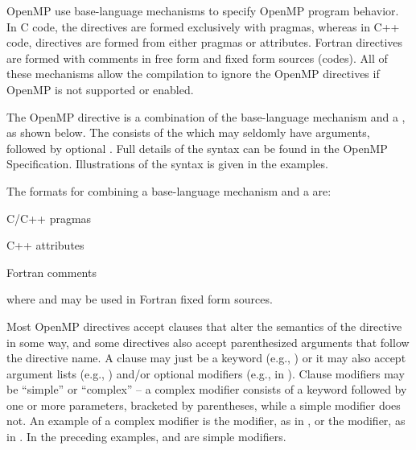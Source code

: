 \label{chap:directive_syntax}

OpenMP  use base-language mechanisms to specify OpenMP program behavior.
In C code, the directives are formed exclusively with pragmas, whereas in C++
code, directives are formed from either pragmas or attributes.
Fortran directives are formed with comments in free form and fixed form sources (codes).
All of these mechanisms allow the compilation to ignore the OpenMP directives if
OpenMP is not supported or enabled.


The OpenMP directive is a combination of the base-language mechanism and a ,
as shown below. The  consists
of the  which may seldomly have arguments, 
followed by optional . Full details of the syntax can be found in the OpenMP Specification.
Illustrations of the syntax is given in the examples.

The formats for combining a base-language mechanism and a  are:

C/C++ pragmas
\begin{indentedcodelist}
 
\end{indentedcodelist}

C++ attributes
\begin{indentedcodelist}
\end{indentedcodelist}

Fortran comments
\begin{indentedcodelist}
 
\end{indentedcodelist}

where  and  may be used in Fortran fixed form sources.

Most OpenMP directives accept clauses that alter the semantics of the directive in some way, 
and some directives also accept parenthesized arguments that follow the directive name. 
A clause may just be a keyword (e.g., ) or it may also accept argument lists 
(e.g., ) and/or optional modifiers (e.g.,  in 
).
Clause modifiers may be ``simple'' or ``complex'' -- a complex modifier consists of a
keyword followed by one or more parameters, bracketed by parentheses, while a simple 
modifier does not. An example of a complex modifier is the  modifier, 
as in , or the  modifier, as in 
. 
In the preceding examples,  and  are simple modifiers.

